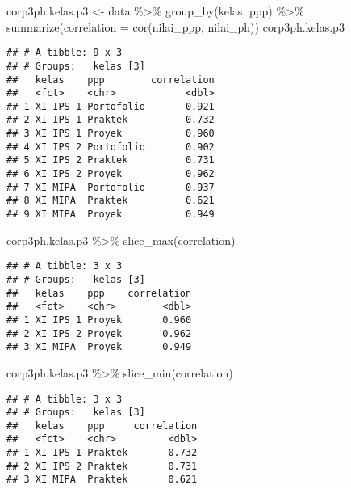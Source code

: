 \documentclass[
]{article}
\newenvironment{Shaded}{\begin{snugshade}}{\end{snugshade}}
\newcommand{\AttributeTok}[1]{\textcolor[rgb]{0.77,0.63,0.00}{#1}}
\newcommand{\FunctionTok}[1]{\textcolor[rgb]{0.00,0.00,0.00}{#1}}
\newcommand{\NormalTok}[1]{#1}
\newcommand{\OtherTok}[1]{\textcolor[rgb]{0.56,0.35,0.01}{#1}}
\newcommand{\SpecialCharTok}[1]{\textcolor[rgb]{0.00,0.00,0.00}{#1}}
\begin{document}
\begin{Shaded}
\begin{Highlighting}[]
\NormalTok{corp3ph.kelas.p3 }\OtherTok{\textless{}{-}}\NormalTok{ data }\SpecialCharTok{\%\textgreater{}\%} 
  \FunctionTok{group\_by}\NormalTok{(kelas, ppp) }\SpecialCharTok{\%\textgreater{}\%} 
  \FunctionTok{summarize}\NormalTok{(}\AttributeTok{correlation =} \FunctionTok{cor}\NormalTok{(nilai\_ppp, nilai\_ph))}
\NormalTok{corp3ph.kelas.p3}
\end{Highlighting}
\end{Shaded}

\begin{verbatim}
## # A tibble: 9 x 3
## # Groups:   kelas [3]
##   kelas    ppp        correlation
##   <fct>    <chr>            <dbl>
## 1 XI IPS 1 Portofolio       0.921
## 2 XI IPS 1 Praktek          0.732
## 3 XI IPS 1 Proyek           0.960
## 4 XI IPS 2 Portofolio       0.902
## 5 XI IPS 2 Praktek          0.731
## 6 XI IPS 2 Proyek           0.962
## 7 XI MIPA  Portofolio       0.937
## 8 XI MIPA  Praktek          0.621
## 9 XI MIPA  Proyek           0.949
\end{verbatim}

\begin{Shaded}
\begin{Highlighting}[]
\NormalTok{corp3ph.kelas.p3 }\SpecialCharTok{\%\textgreater{}\%} \FunctionTok{slice\_max}\NormalTok{(correlation)}
\end{Highlighting}
\end{Shaded}

\begin{verbatim}
## # A tibble: 3 x 3
## # Groups:   kelas [3]
##   kelas    ppp    correlation
##   <fct>    <chr>        <dbl>
## 1 XI IPS 1 Proyek       0.960
## 2 XI IPS 2 Proyek       0.962
## 3 XI MIPA  Proyek       0.949
\end{verbatim}

\begin{Shaded}
\begin{Highlighting}[]
\NormalTok{corp3ph.kelas.p3 }\SpecialCharTok{\%\textgreater{}\%} \FunctionTok{slice\_min}\NormalTok{(correlation)}
\end{Highlighting}
\end{Shaded}

\begin{verbatim}
## # A tibble: 3 x 3
## # Groups:   kelas [3]
##   kelas    ppp     correlation
##   <fct>    <chr>         <dbl>
## 1 XI IPS 1 Praktek       0.732
## 2 XI IPS 2 Praktek       0.731
## 3 XI MIPA  Praktek       0.621
\end{verbatim}
\end{document}

